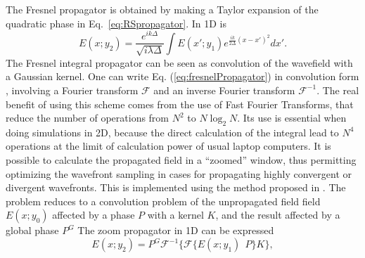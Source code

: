 \documentclass{iopconfser}
\begin{document}
The Fresnel propagator is obtained by making a Taylor expansion of the quadratic phase in Eq.~\ref{eq:RSpropagator}. In 1D is 
\begin{equation}\label{eq:fresnelPropagator}
E(x;y_2) =  \frac{e^{i k \Delta}}{\sqrt{i \lambda \Delta}} \int E(x';y_1) e^{ \frac{i k}{2 \Delta}  (x-x')^2  }  dx'.
\end{equation}
The Fresnel integral propagator can be seen as convolution of the wavefield with a Gaussian kernel. One can write Eq. (\ref{eq:fresnelPropagator}) in convolution form \cite{goodmanfourier}, involving a Fourier transform $\mathcal{F}$ and an inverse Fourier transform $\mathcal{F}^{-1}$. The real benefit of using this scheme comes from the use of Fast Fourier Transforms, that reduce the number of operations from $N^2$ to $N \log_2 N$. Its use is essential when doing simulations in 2D, because the direct calculation of the integral lead to $N^4$ operations at the limit of calculation power of usual laptop computers.
It is possible to calculate the propagated field in a ``zoomed'' window, thus permitting optimizing the wavefront sampling in cases for propagating highly convergent or divergent wavefronts. This is implemented using the method proposed in \cite{schmidt}. The problem reduces to a convolution problem of the unpropagated field field $E(x;y_0)$ affected by a phase $P$ with a kernel $K$, and the result affected by a global phase $P^G$
%
%
The zoom propagator in 1D can be expressed 
\begin{equation}
E(x; y_2) = P^G \mathcal{F}^{-1} \Big\{ \mathcal{F} \big\{ E(x;y_1)~~P \big\} K \Big\},
\end{equation}
\end{document}
